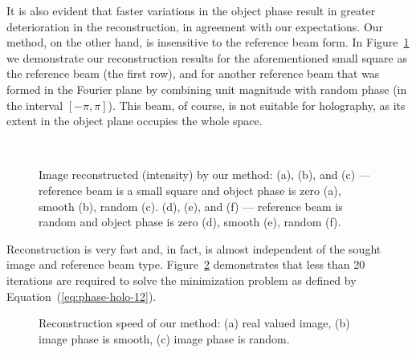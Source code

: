 It is also evident
that faster variations in the object phase result in greater
deterioration in the reconstruction, in agreement with our
expectations. Our method, on the other hand, is insensitive to the
reference beam form. In Figure~\ref{fig:we-reconstruction-intensity} we
demonstrate our reconstruction results for the aforementioned small
square as the reference beam (the first row), and for another
reference beam that was formed in the Fourier plane by combining unit
magnitude with random phase (in the interval $[-\pi, \pi]$). This
beam, of course, is not suitable for holography, as its extent in the
object plane occupies the whole space.
\begin{figure}[H]
  \centering
  \quad{}
  \quad{}
  \\
  \quad{}
  \quad{}
  \caption[Image reconstructed by our method]{Image reconstructed (intensity) by our method:
    (a), (b), and (c) --- reference beam is a small square and object
    phase is zero (a), smooth (b), random (c).
    (d), (e), and (f) --- reference beam is random and object phase
    is zero (d), smooth (e), random (f).}
  \label{fig:we-reconstruction-intensity}
\end{figure}


Reconstruction is very fast
and, in fact, is almost independent of the sought image and reference
beam type. Figure~\ref{fig:phase-holo-we-reconstruction-speed} demonstrates that
less than 20 iterations are required to solve the minimization problem
as defined by Equation~(\ref{eq:phase-holo-12}).
\begin{figure}[H]
  \centering
  \qquad{}
  \caption[Reconstruction speed of our method]{Reconstruction speed of our method: (a) real valued image,
    (b) image phase is smooth, (c) image phase is random.}
  \label{fig:phase-holo-we-reconstruction-speed}
\end{figure}




